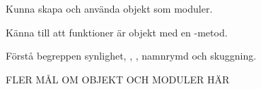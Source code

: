 
\item Kunna skapa och använda objekt som moduler.
\item Känna till att funktioner är objekt med en -metod.
\item Förstå begreppen synlighet, , , namnrymd och skuggning.
\item \TODO FLER MÅL OM OBJEKT OCH MODULER HÄR
